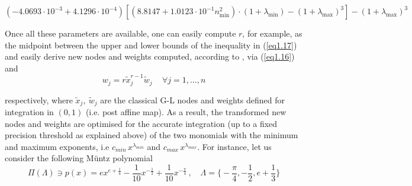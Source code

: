 \documentclass[a4paper, twosided]{book}
\begin{document}
\begin{equation}\label{eq1.18}
    (-4.0693\cdot10^{-3}+4.1296\cdot10^{-4})[(8.8147+1.0123\cdot10^{-1}n_{\text{min}}^2)\cdot(1+\lambda_{\text{min}})-(1+\lambda_{\text{max}})^3] - (1+\lambda_{\text{max}})^3
\end{equation}

\noindent
Once all these parameters are available, one can easily compute $r$, for example, as the midpoint between the upper and lower bounds of the inequality in (\ref{eq1.17}) and easily derive new nodes and weights computed, according to \cite{Lombardi09,Lombardi21}, via (\ref{eq1.16}) and 
\begin{equation}\label{eq1.19}
    w_j = r\tilde{x}_j^{r-1}\tilde{w}_j\,\quad\forall j=1,...,n
\end{equation}

\noindent
respectively, where $\tilde{x}_j,\:\tilde{w}_j$ are the classical G-L nodes and weights defined for integration in $(0,1)$ (i.e. post affine map). As a result, the transformed new nodes and weights are optimised for the accurate integration (up to a fixed precision threshold as explained above) of the two monomials with the minimum and maximum exponents, i.e $c_{min}\,x^{\lambda_{min}}$ and $c_{max}\,x^{\lambda_{max}}$. For instance, let us consider the following  Müntz polynomial
\begin{equation}\label{eq1.20}
    \Pi(\Lambda)\ni p(x) = ex^{e+\frac{1}{4}} -\frac{1}{10}x^{-\frac{1}{2}} + \frac{1}{10}x^{-\frac{\pi}{4}}\,,\quad\Lambda=\Big\{-\frac{\pi}{4},-\frac{1}{2},e+\frac{1}{3}\Big\}
\end{equation}
\end{document}
